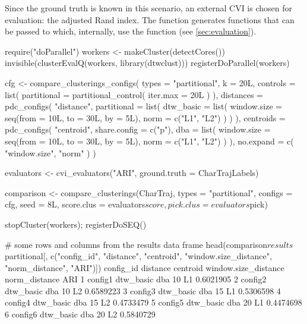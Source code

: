 Since the ground truth is known in this scenario,
an external CVI is chosen for evaluation:
the adjusted Rand index.
The  function generates functions that can be passed to  which, internally, use the  function
(see \cref{sec:evaluation}).

\begin{example}
require("doParallel")
workers <- makeCluster(detectCores())
invisible(clusterEvalQ(workers, library(dtwclust)))
registerDoParallel(workers)

cfg <- compare_clusterings_configs(
    types = "partitional",
    k = 20L,
    controls = list(
        partitional = partitional_control(
            iter.max = 20L
        )
    ),
    distances = pdc_configs(
        "distance",
        partitional = list(
            dtw_basic = list(
                window.size = seq(from = 10L, to = 30L, by = 5L),
                norm = c("L1", "L2")
            )
        )
    ),
    centroids = pdc_configs(
        "centroid",
        share.config = c("p"),
        dba = list(
            window.size = seq(from = 10L, to = 30L, by = 5L),
            norm = c("L1", "L2")
        )
    ),
    no.expand = c(
        "window.size",
        "norm"
    )
)

evaluators <- cvi_evaluators("ARI", ground.truth = CharTrajLabels)

comparison <- compare_clusterings(CharTraj, types = "partitional",
                                  configs = cfg, seed = 8L,
                                  score.clus = evaluators$score,
                                  pick.clus = evaluators$pick)

stopCluster(workers); registerDoSEQ()

# some rows and columns from the results data frame
head(comparison$results$partitional[, c("config_id", "distance", "centroid",
                                        "window.size_distance", "norm_distance",
                                        "ARI")])
  config_id  distance centroid window.size_distance norm_distance       ARI
1   config1 dtw_basic      dba                   10            L1 0.6021905
2   config2 dtw_basic      dba                   10            L2 0.6589223
3   config3 dtw_basic      dba                   15            L1 0.5306598
4   config4 dtw_basic      dba                   15            L2 0.4733479
5   config5 dtw_basic      dba                   20            L1 0.4474698
6   config6 dtw_basic      dba                   20            L2 0.5840729
\end{example}

